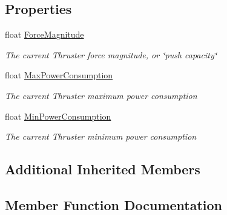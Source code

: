 \subsection*{Properties}
\begin{DoxyCompactItemize}
\item 
float \hyperlink{class_s_e_mod_a_p_i_1_1_a_p_i_1_1_definitions_1_1_cube_blocks_1_1_thruster_definition_ad7bbf3c2a192e71cc986aa4a6217dd12}{Force\+Magnitude}
\begin{DoxyCompactList}\small\item\em The current Thruster force magnitude, or \char`\"{}push capacity\char`\"{} \end{DoxyCompactList}\item 
float \hyperlink{class_s_e_mod_a_p_i_1_1_a_p_i_1_1_definitions_1_1_cube_blocks_1_1_thruster_definition_afbbbc982d9271bf6f2da319da396fe18}{Max\+Power\+Consumption}
\begin{DoxyCompactList}\small\item\em The current Thruster maximum power consumption \end{DoxyCompactList}\item 
float \hyperlink{class_s_e_mod_a_p_i_1_1_a_p_i_1_1_definitions_1_1_cube_blocks_1_1_thruster_definition_a4dbd839846ea68c5bf5b786d16e61c9e}{Min\+Power\+Consumption}
\begin{DoxyCompactList}\small\item\em The current Thruster minimum power consumption \end{DoxyCompactList}\end{DoxyCompactItemize}
\subsection*{Additional Inherited Members}


\subsection{Member Function Documentation}
\hypertarget{class_s_e_mod_a_p_i_1_1_a_p_i_1_1_definitions_1_1_cube_blocks_1_1_thruster_definition_a7158efad5eee51be57ff2e18e6a3a832}{}
